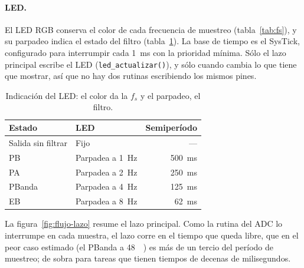 \documentclass[11pt,a4paper]{article}
\begin{document}

\paragraph{LED.} El LED RGB conserva el color de cada frecuencia de muestreo
(tabla~\ref{tab:fs}), y su parpadeo indica el estado del filtro
(tabla~\ref{tab:led}). La base de tiempo es el SysTick, configurado para
interrumpir cada \qty{1}{\milli\second} con la prioridad mínima. Sólo el
lazo principal escribe el LED (\texttt{led\_actualizar()}), y sólo cuando
cambia lo que tiene que mostrar, así que no hay dos rutinas escribiendo los
mismos pines.

\begin{table}[H]
\centering
\caption{Indicación del LED: el color da la $f_s$ y el parpadeo, el filtro.}
\label{tab:led}
\begin{tabular}{@{}l l r@{}}
\toprule
\textbf{Estado} & \textbf{LED} & \textbf{Semiperíodo}\\
\midrule
Salida sin filtrar      & Fijo                       & ---\\
PB                      & Parpadea a \qty{1}{\hertz} & \qty{500}{\milli\second}\\
PA                      & Parpadea a \qty{2}{\hertz} & \qty{250}{\milli\second}\\
PBanda                  & Parpadea a \qty{4}{\hertz} & \qty{125}{\milli\second}\\
EB                      & Parpadea a \qty{8}{\hertz} & \qty{62}{\milli\second}\\
\bottomrule
\end{tabular}
\end{table}

La figura~\ref{fig:flujo-lazo} resume el lazo principal. Como la rutina del
ADC lo interrumpe en cada muestra, el lazo corre en el tiempo que queda
libre, que en el peor caso estimado (el PBanda a \qty{48}{\kilo\sps}) es más
de un tercio del período de muestreo; de sobra para tareas que tienen
tiempos de decenas de milisegundos.
\end{document}
